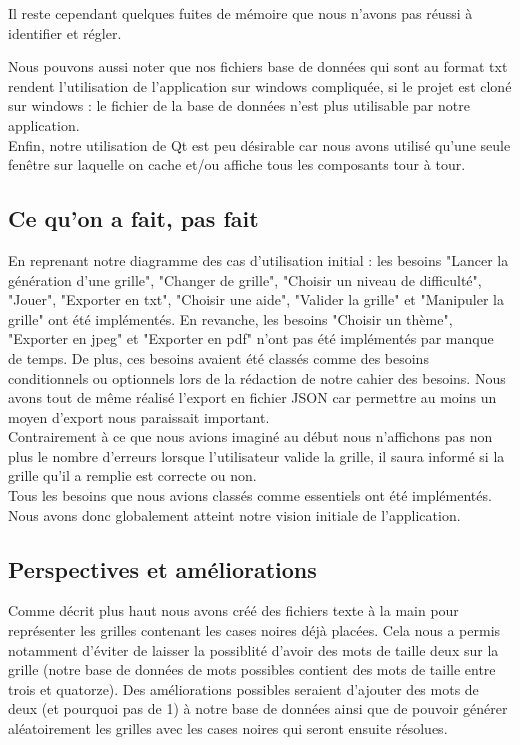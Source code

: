\documentclass [ 11 pt ] {article}
\begin{document}
Il reste cependant quelques fuites de mémoire que nous n'avons pas réussi à identifier et régler. 

Nous pouvons aussi noter que nos fichiers base de données qui sont au format txt rendent l'utilisation de l'application sur windows compliquée, si le projet est cloné sur windows : le fichier de la base de données n'est plus utilisable par notre application.\\

Enfin, notre utilisation de Qt est peu désirable car nous avons utilisé qu'une seule fenêtre sur laquelle on cache et/ou affiche tous les composants tour à tour.\\
 

\subsection{Ce qu'on a fait, pas fait} 
En reprenant notre diagramme des cas d'utilisation initial : les besoins "Lancer la génération d'une grille", "Changer de grille", "Choisir un niveau de difficulté", "Jouer", "Exporter en txt", "Choisir une aide", "Valider la grille" et "Manipuler la grille" ont été implémentés. En revanche, les besoins "Choisir un thème", "Exporter en jpeg" et "Exporter en pdf" n'ont pas été implémentés par manque de temps. De plus, ces besoins avaient été classés comme des besoins conditionnels ou optionnels lors de la rédaction de notre cahier des besoins. Nous avons tout de même réalisé l'export en fichier JSON car permettre au moins un moyen d'export nous paraissait important. \\

Contrairement à ce que nous avions imaginé au début nous n'affichons pas non plus le nombre d'erreurs lorsque l'utilisateur valide la grille, il saura informé si la grille qu'il a remplie est correcte ou non. \\

Tous les besoins que nous avions classés comme essentiels ont été implémentés. Nous avons donc globalement atteint notre vision initiale de l’application.\\

\subsection{Perspectives et améliorations}
Comme décrit plus haut nous avons créé des fichiers texte à la main pour représenter les grilles contenant les cases noires déjà placées. Cela nous a permis notamment d'éviter de laisser la possiblité d'avoir des mots de taille deux sur la grille (notre base de données de mots possibles contient des mots de taille entre trois et quatorze). Des améliorations possibles seraient d'ajouter des mots de deux (et pourquoi pas de 1) à notre base de données ainsi que de pouvoir générer aléatoirement les grilles avec les cases noires qui seront ensuite résolues. \\
\end{document}
